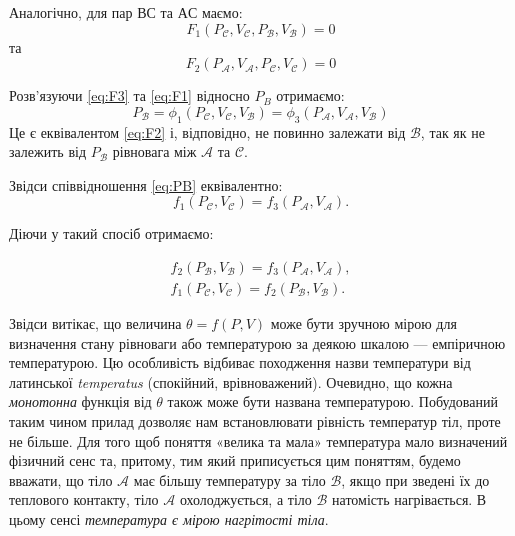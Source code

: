 Аналогічно, для пар $ВС$ та $АС$ маємо:
\begin{equation}\label{eq:F1}
    F_1  (P_{\mathcal{C}}, V_{\mathcal{C}} ,P_{\mathcal{B}},V_{\mathcal{B}})=0
\end{equation}
та
\begin{equation}\label{eq:F2}
    F_2  (P_{\mathcal{A}},V_{\mathcal{A}}, P_{\mathcal{C}}, V_{\mathcal{C}} )=0
\end{equation}

Розв'язуючи \eqref{eq:F3} та \eqref{eq:F1} відносно $P_B$ отримаємо:
\begin{equation}\label{eq:PB}
    P_{\mathcal{B}} = \phi_1 (P_{\mathcal{C}}, V_{\mathcal{C}}, V_{\mathcal{B}})=\phi_3 (P_{\mathcal{A}}, V_{\mathcal{A}}, V_{\mathcal{B}})
\end{equation}
Це є еквівалентом \eqref{eq:F2} і, відповідно,  не повинно залежати від $\mathcal{B}$, так як не залежить від $P_{\mathcal{B}}$ рівновага між $\mathcal{A}$ та $\mathcal{C}$.

Звідси співвідношення \eqref{eq:PB} еквівалентно:
\begin{equation}\label{eq:f1}
    f_1 (P_{\mathcal{C}},V_{\mathcal{C}})=f_3 (P_{\mathcal{A}}, V_{\mathcal{A}}).
\end{equation}

Діючи у такий спосіб отримаємо:

\begin{align}
    f_2 (P_{\mathcal{B}}, V_{\mathcal{B}})=f_3 (P_{\mathcal{A}}, V_{\mathcal{A}}), \\
    f_1 (P_{\mathcal{C}}, V_{\mathcal{C}})=f_2 (P_{\mathcal{B}}, V_{\mathcal{B}}).
\end{align}

Звідси витікає, що величина $\theta = f(P, V)$ може бути зручною мірою для визначення стану рівноваги або температурою за деякою шкалою --- емпіричною температурою. Цю особливість відбиває походження назви температури від латинської \emph{temperatus} (спокійний, врівноважений). Очевидно, що кожна \emph{монотонна} функція від $\theta$ також може бути названа температурою. Побудований таким чином прилад дозволяє нам встановлювати рівність температур тіл, проте не більше. Для того щоб поняття «велика та мала» температура мало визначений фізичний сенс та, притому, тим який приписується цим поняттям, будемо вважати, що тіло $\mathcal{A}$ має більшу температуру за тіло $\mathcal{B}$, якщо при зведені їх до теплового контакту, тіло $\mathcal{A}$ охолоджується, а тіло $\mathcal{B}$ натомість нагрівається. В цьому сенсі \emph{температура є мірою нагрітості тіла}.


